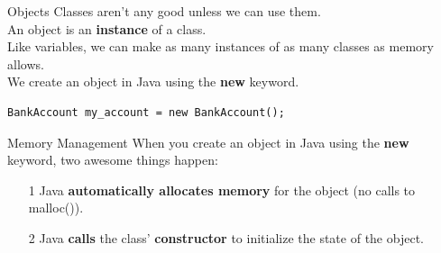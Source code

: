 \documentclass{beamer}
\begin{document}
\begin{frame}[fragile]{Objects}
Classes aren't any good unless we can use them. \\
\vspace{0.5em}
An object is an \textbf{instance} of a class.   \\
\vspace{0.5em}
Like variables, we can make as many instances of as many classes as memory allows. \\
\vspace{0.5em}
We create an object in Java using the \textbf{new} keyword. \\
\vspace{0.5em}
\begin{Verbatim}
BankAccount my_account = new BankAccount();
\end{Verbatim}
\end{frame}



\begin{frame}[fragile]{Memory Management}
When you create an object in Java using the \textbf{new} keyword, two awesome things happen: \\
\begin{itemize}
\item[1] Java \textbf{automatically allocates memory} for the object (no calls to malloc()).
\item[2] Java \textbf{calls} the class' \textbf{constructor} to initialize the state of the object. \\
\end{itemize}
\end{frame}
\end{document}

